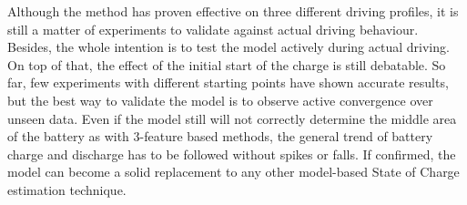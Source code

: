 %
Although the method has proven effective on three different driving profiles, it is still a matter of experiments to validate against actual driving behaviour.
Besides, the whole intention is to test the model actively during actual driving.
On top of that, the effect of the initial start of the charge is still debatable.
So far, few experiments with different starting points have shown accurate results, but the best way to validate the model is to observe active convergence over unseen data.
Even if the model still will not correctly determine the middle area of the battery as with 3-feature based methods, the general trend of battery charge and discharge has to be followed without spikes or falls.
If confirmed, the model can become a solid replacement to any other model-based State of Charge estimation technique.


